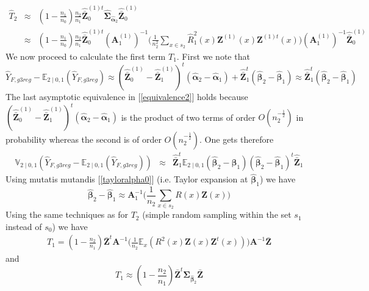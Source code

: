 \documentclass[a4paper,12pt,leqno, titlepage]{article}
\newcommand{\EX}{\mathbb{E}}
\newcommand{\VAR}{\mathbb{V}}
\begin{document}
\begin{appendix}
\begin{eqnarray}\label{appendixhatt2}
\hat{T}_2 & \approx &
(1-\frac{n_1}{n_0})\frac{n_2}{n_1}\hat{\bar{\pmb{Z}}}_0^{(1)t}
\hat{\pmb{\Sigma}}_{\hat{\pmb{\alpha}}_2}\hat{\bar{\pmb{Z}}}_0^{(1)} \nonumber \\
&\approx & (1-\frac{n_1}{n_0})\frac{n_2}{n_1}\hat{\bar{\pmb{Z}}}_0^{(1)t}(\pmb{A}^{(1)}_1)^{-1}\Big(\frac{1}{n_2^2}
\sum_{x\in{s_2}}\hat{R}^2_1(x)\pmb{Z}^{(1)}(x)\pmb{Z}^{(1)t}(x)\Big)(\pmb{A}^{(1)}_1)^{-1}\hat{\bar{\pmb{Z}}}_0^{(1)}
\end{eqnarray}
We now proceed to calculate the first term $T_1$. First we note that
\begin{equation}\label{equivalence2}
\hat{Y}_{F,g3reg}-\EX_{2 \mid 0,1}(\hat{Y}_{F,g3reg})\approx (\hat{\bar{\pmb{Z}}}^{(1)}_0-\hat{\bar{\pmb{Z}}}^{(1)}_1)^t
(\hat{\pmb{\alpha}}_{2}-\hat{\pmb{\alpha}}_{1})+\hat{\bar{\pmb{Z}}}^{t}_1(\hat{\pmb{\beta}}_2-\hat{\pmb{\beta}}_1)
\approx \hat{\bar{\pmb{Z}}}^{t}_1(\hat{\pmb{\beta}}_2-\hat{\pmb{\beta}}_1)
\end{equation}
The last asymptotic equivalence in [\ref{equivalence2}] holds because  $(\hat{\bar{\pmb{Z}}}^{(1)}_0-\hat{\bar{\pmb{Z}}}^{(1)}_1)^t(\hat{\pmb{\alpha}}_{2}-\hat{\pmb{\alpha}}_{1})$ is the product of two terms of order $O(n_2^{-\frac{1}{2}})$ in probability whereas the second is of order $O(n_2^{-\frac{1}{2}})$. One gets therefore
\begin{eqnarray*}
\VAR_{2 \mid 0,1}(\hat{Y}_{F,g3reg}-\EX_{2 \mid 0,1}(\hat{Y}_{F,g3reg})) &\approx &
\hat{\bar{\pmb{Z}}}^{t}_1\EX_{2 \mid 0,1}(\hat{\pmb{\beta}}_2-\hat{\pmb{\beta}}_1)(\hat{\pmb{\beta}}_2-\hat{\pmb{\beta}}_1)^t\hat{\bar{\pmb{Z}}}_1 \nonumber \end{eqnarray*}
Using mutatis mutandis [\ref{tayloralpha0}] (i.e. Taylor expansion at $\hat{\pmb{\beta}}_1$) we have
\begin{equation}\label{taylorbeta1}
\hat{\pmb{\beta}}_2-\hat{\pmb{\beta}}_1  \approx \pmb{A}^{-1}_1\Big(\frac{1}{n_2}\sum_{x\in{s_2}}R(x)\pmb{Z}(x)\Big)
\end{equation}
Using the same techniques as for $T_2$ (simple random sampling within the set $s_1$ instead of $s_0$)
we have
\begin{eqnarray}\label{appendixt1}
T_1=(1-\frac{n_2}{n_1})\bar{\pmb{Z}}^{t}\pmb{A}^{-1}\Big(\frac{1}{n_2}\EX_x( R^2 (x)\pmb{Z}(x)
\pmb{Z}^{t}(x))\Big)\pmb{A}^{-1}\bar{\pmb{Z}}
\end{eqnarray}
and
\begin{equation}\label{appendixt1}
T_1 \approx (1-\frac{n_2}{n_1})\bar{\pmb{Z}}^{t}\pmb{\Sigma}_{\pmb{\hat{\beta}}_2}\bar{\pmb{Z}}

\end{equation}
\end{appendix}
\end{document}
